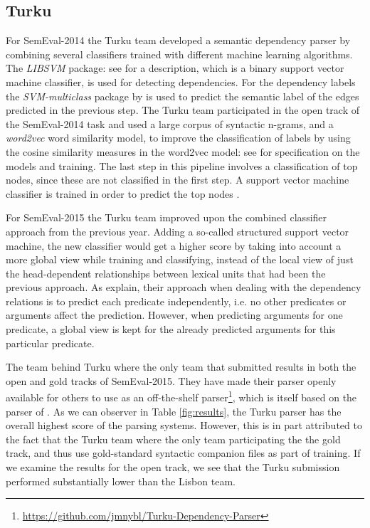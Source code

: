 \subsection{Turku}

For SemEval-2014 the Turku team developed a semantic dependency parser by combining several classifiers trained with different machine learning algorithms. The \textit{LIBSVM} package: see  for a description, which is a binary support vector machine classifier, is used for detecting dependencies. For the dependency labels the \textit{SVM-multiclass} package by  is used to predict the semantic label of the edges predicted in the previous step. The Turku team participated in the open track of the SemEval-2014 task and used a large corpus of syntactic n-grams, and a \textit{word2vec} word similarity model, to improve the classification of labels by using the cosine similarity measures in the word2vec model: see  for specification on the models and training. The last step in this pipeline involves a classification of top nodes, since these are not classified in the first step. A support vector machine classifier is trained in order to predict the top nodes \cite{Kanerva:Turku:14}. 

For SemEval-2015 the Turku team improved upon the combined classifier approach from the previous year. Adding a so-called structured support vector machine, the new classifier would get a higher score by taking into account a more global view while training and classifying, instead of the local view of just the head-dependent relationships between lexical units that had been the previous approach. As  explain, their approach when dealing with the dependency relations is to predict each predicate independently, i.e. no other predicates or arguments affect the prediction. However, when predicting arguments for one predicate, a global view is kept for the already predicted arguments for this particular predicate. 

The team behind Turku where the only team that submitted results in both the open and gold tracks of SemEval-2015. They have made their parser openly available for others to use as an off-the-shelf parser\footnote{\url{https://github.com/jmnybl/Turku-Dependency-Parser}}, which is itself based on the parser of . As we can observer in Table \ref{fig:results}, the Turku parser has the overall highest score of the parsing systems. However, this is in part attributed to the fact that the Turku team where the only team participating the the gold track, and thus use gold-standard syntactic companion files as part of training. If we examine the results for the open track, we see that the Turku submission performed substantially lower than the Lisbon team. 

